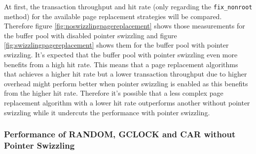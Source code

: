     At first, the transaction throughput and hit rate (only regarding the \lstinline{fix_nonroot} method) for the available page replacement strategies will be compared. Therefore figure \ref{fig:noswizzlingpagereplacement} shows those measurements for the buffer pool with disabled pointer swizzling and figure \ref{fig:swizzlingpagereplacement} shows them for the buffer pool with pointer swizzling. It's expected that the buffer pool with pointer swizzling even more benefits from a high hit rate. This means that a page replacement algorithms that achieves a higher hit rate but a lower transaction throughput due to higher overhead might perform better when pointer swizzling is enabled as this benefits from the higher hit rate. Therefore it's possible that a less complex page replacement algorithm with a lower hit rate outperforms another without pointer swizzling while it undercuts the performance with pointer swizzling.

\subsubsection{Performance of RANDOM, GCLOCK and CAR without Pointer Swizzling}

